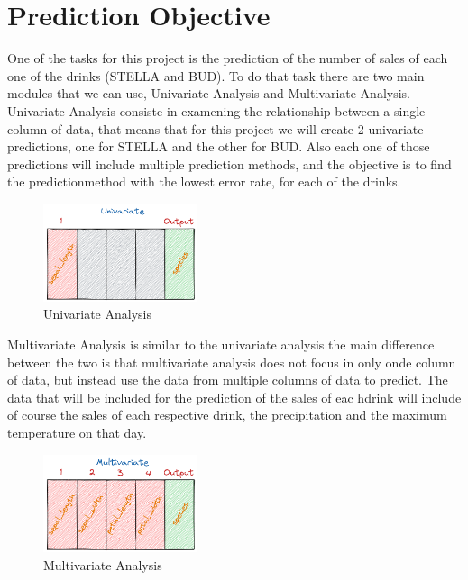 \newpage

\section{Prediction Objective}

\quad One of the tasks for this project is the prediction of the number of sales of each one of the drinks (STELLA and BUD). To do that task there are two main modules that we can use, Univariate Analysis and Multivariate Analysis.\\

Univariate Analysis consiste in examening the relationship between a single column of data, that means that for this project we will create 2 univariate predictions, one for STELLA and the other for BUD. Also each one of those predictions will include multiple prediction methods, and the objective is to find the predictionmethod with the lowest error rate, for each of the drinks.

\begin{figure}[H]
    \centering
    \includegraphics[width=0.4\textwidth]{assets/univariate_dataset.png}
    \caption{Univariate Analysis}
    \label{fig:univariate_dataset}
    \end{figure}

Multivariate Analysis is similar to the univariate analysis the main difference between the two is that multivariate analysis does not focus in only onde column of data, but instead use the data from multiple columns of data to predict. The data that will be included for the prediction of the sales of eac hdrink will include of course the sales of each respective drink, the precipitation and the maximum temperature on that day.


\begin{figure}[H]
    \centering
    \includegraphics[width=0.4\textwidth]{assets/multivariate_dataset.png}
    \caption{Multivariate Analysis}
    \label{fig:mulivariate_dataset}
    \end{figure}



